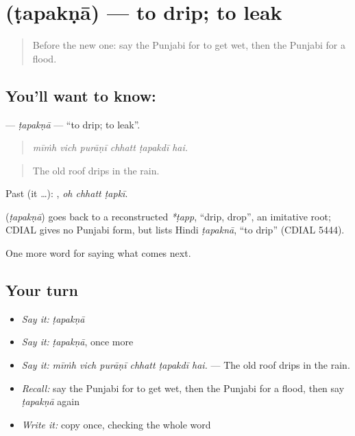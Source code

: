 \section[\texorpdfstring{\pa{ਟਪਕਣਾ} (ṭapakṇā)}{ਟਪਕਣਾ (ṭapakṇā)}]{ (ṭapakṇā) — to drip; to leak}

\label{lesson:PA-C287-tapakna}



\begin{quote}
Before the new one: say the Punjabi for to get wet, then the Punjabi for a flood.
\end{quote}

\subsection*{You'll want to know: }
\textbf{} — \emph{ṭapakṇā} — \textquotedblleft{}to drip; to leak\textquotedblright{}.

\begin{quote}
     
\end{quote}

\begin{quote}
\emph{mīṁh vich purāṇī chhatt ṭapakdī hai.}
\end{quote}

\begin{quote}
The old roof drips in the rain.
\end{quote}

Past (it …):   , \emph{oh chhatt ṭapkī}.

\begin{cousinweb}
\textbf{} (\emph{ṭapakṇā}) goes back to a reconstructed \emph{*ṭapp}, \textquotedblleft{}drip, drop\textquotedblright{}, an imitative root; CDIAL gives no Punjabi form, but lists Hindi \emph{ṭapaknā}, \textquotedblleft{}to drip\textquotedblright{} (CDIAL 5444).
\end{cousinweb}

\begin{grammarlens}[title={What you've built}]
One more word for saying what comes next.
\end{grammarlens}

\subsection*{Your turn}
\begin{itemize}
\raggedright
  \item \emph{Say it:} \emph{ṭapakṇā}
  \item \emph{Say it:} \emph{ṭapakṇā}, once more
  \item \emph{Say it:} \emph{mīṁh vich purāṇī chhatt ṭapakdī hai.} — The old roof drips in the rain.
  \item \emph{Recall:} say the Punjabi for to get wet, then the Punjabi for a flood, then say \emph{ṭapakṇā} again
  \item \emph{Write it:} copy \textbf{} once, checking the whole word
\end{itemize}


